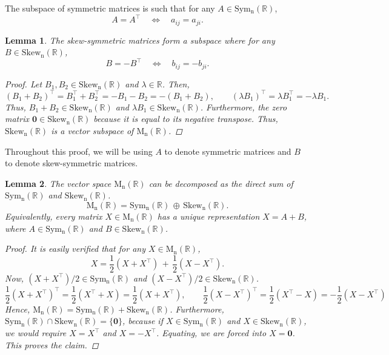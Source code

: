 \documentclass[10pt]{article}
\def\MnR{\operatorname{M_n(\mathbb{R})}}
\def\Sym{\operatorname{Sym_n(\mathbb{R})}}
\def\Skew{\operatorname{Skew_n(\mathbb{R})}}
\newtheorem{lemma}{Lemma}
\begin{document}
        The subspace of symmetric matrices is such that for any $A \in \Sym$,
        \[
                A = A^\top \quad \Leftrightarrow \quad a_{ij} = a_{ji}.
        \]
        \begin{lemma}
                The skew-symmetric matrices form a subspace where for any $B \in \Skew$,
                \[
                        B = -B^\top \quad \Leftrightarrow \quad b_{ij} = -b_{ji}.
                \]
                \begin{proof}
                        Let $B_1, B_2 \in \Skew$ and $\lambda \in \mathbb{R}$. Then,
                        \[
                                (B_1 + B_2)^\top = B_1^\top + B_2^\top = -B_1 - B_2 = - (B_1 + B_2), \qquad
                                (\lambda B_1)^\top = \lambda B_1^\top = -\lambda B_1.
                        \]
                        Thus, $B_1 + B_2 \in \Skew$ and $\lambda B_1 \in \Skew$. Furthermore, the zero matrix $\mathbf{0} \in \Skew$
                        because it is equal to its negative transpose. Thus, $\Skew$ is a vector subspace of $\MnR$.
                \end{proof}
        \end{lemma}
        Throughout this proof, we will be using $A$ to denote symmetric matrices and $B$ to denote skew-symmetric matrices.
        \begin{lemma}
                The vector space $\MnR$ can be decomposed as the direct sum of $\Sym$ and $\Skew$.
                \[
                        \MnR = \Sym \,\oplus\, \Skew.
                \]
                Equivalently, every matrix $X \in \MnR$ has a unique representation $X = A + B$, where $A \in \Sym$ and $B \in \Skew$.
                \begin{proof}
                        It is easily verified that for any $X \in \MnR$,
                        \[
                                X = \frac{1}{2}(X + X^\top) \,+\, \frac{1}{2}(X - X^\top).
                        \]
                        Now, $(X + X^\top)/2 \in \Sym$ and $(X - X^\top)/2 \in \Skew$.
                        \[
                                \frac{1}{2}(X + X^\top)^\top = \frac{1}{2}(X^\top + X) = \frac{1}{2}(X + X^\top), \qquad
                                \frac{1}{2}(X - X^\top)^\top = \frac{1}{2}(X^\top - X) = -\frac{1}{2}(X - X^\top)
                        \]
                        Hence, $\MnR = \Sym + \Skew$. Furthermore, $\Sym \cap \Skew = \{\mathbf{0}\}$, because if $X \in \Sym$ and
                        $X \in \Skew$, we would require $X = X^\top$ and $X = -X^\top$. Equating, we are forced into $X = \mathbf{0}$.
                        This proves the claim.
                \end{proof}
        \end{lemma}
\end{document}
